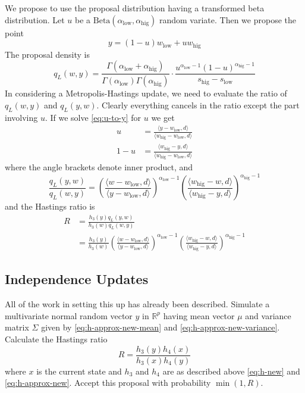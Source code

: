 \documentclass[11pt]{article}
\newcommand{\real}{\mathbb{R}}
\newcommand{\inner}[1]{\langle #1 \rangle}
\begin{document}
We propose to use the proposal distribution having a transformed
beta distribution.  Let $u$ be a
$\text{Beta}(\alpha_\text{low}, \alpha_\text{hig})$ random variate.
Then we propose the point
\begin{equation} \label{eq:u-to-y}
   y = (1 - u) w_\text{low} + u w_\text{hig}
\end{equation}
The proposal density is
$$
   q_L(w, y)
   =
   \frac{\Gamma(\alpha_\text{low} + \alpha_\text{hig})}
   {\Gamma(\alpha_\text{low}) \Gamma(\alpha_\text{hig})}
   \cdot
   \frac{u^{\alpha_\text{low} - 1} (1 - u)^{\alpha_\text{hig} - 1}}
   {s_\text{hig} - s_\text{low}}
$$
In considering a Metropolis-Hastings update, we need to evaluate
the ratio of $q_L(w, y)$ and $q_L(y, w)$.  Clearly everything cancels
in the ratio except the part involving $u$.  If we solve \eqref{eq:u-to-y}
for $u$ we get
\begin{align*}
   u
   & =
   \frac{\inner{y - w_\text{low}, d}}{\inner{w_\text{hig} - w_\text{low}, d}}
   \\
   1 - u
   & =
   \frac{\inner{w_\text{hig} - y, d}}{\inner{w_\text{hig} - w_\text{low}, d}}
\end{align*}
where the angle brackets denote inner product, and
$$
   \frac{q_L(y, w)}{q_L(w, y)}
   =
   \left( \frac{\inner{w - w_\text{low}, d}}{\inner{y - w_\text{low}, d}}
   \right)^{\alpha_\text{low} - 1}
   \left( \frac{\inner{w_\text{hig} - w, d}}{\inner{w_\text{hig} - y, d}}
   \right)^{\alpha_\text{hig} - 1}
$$
and the Hastings ratio is
\begin{equation} \label{eq:ratio-beta-hastings}
\begin{split}
   R
   & =
   \frac{h_3(y) q_L(y, w)}{h_3(w) q_L(w, y)}
   \\
   & =
   \frac{h_3(y)}{h_3(w)}
   \left( \frac{\inner{w - w_\text{low}, d}}{\inner{y - w_\text{low}, d}}
   \right)^{\alpha_\text{low} - 1}
   \left( \frac{\inner{w_\text{hig} - w, d}}{\inner{w_\text{hig} - y, d}}
   \right)^{\alpha_\text{hig} - 1}
\end{split}
\end{equation}

\subsection{Independence Updates} \label{sec:independence}

All of the work in setting this up has already been described.  Simulate
a multivariate normal random vector $y$ in $\real^p$ having mean vector $\mu$
and variance matrix $\Sigma$ given by \eqref{eq:h-approx-new-mean}
and \eqref{eq:h-approx-new-variance}.  Calculate the Hastings ratio
\begin{equation} \label{eq:ratio-independence}
    R = \frac{h_3(y) h_4(x)}{h_3(x) h_4(y)}
\end{equation}
where $x$ is the current state and $h_3$ and $h_4$ are as described above
\eqref{eq:h-new} and \eqref{eq:h-approx-new}.  Accept this proposal
with probability $\min(1, R)$.
\end{document}
